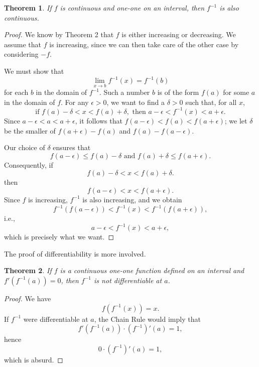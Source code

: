 \documentclass{article}
\numberwithin{corollary}{subsection}
\numberwithin{definition}{subsection}
\numberwithin{lemma}{subsection}
\newtheorem{theorem}{Theorem}
\numberwithin{theorem}{subsection}
\begin{document}
\begin{theorem}
  If $f$ is continuous and one-one on an interval, then $f^{-1}$ is also
  continuous.
\end{theorem}
\begin{proof}
  We know by Theorem 2 that $f$ is either increasing or decreasing. We assume
  that $f$ is increasing, since we can then take care of the other case by
  considering $-f$.

  We must show that \[
    \lim_{x \to b} f^{-1}(x) = f^{-1}(b)
  \] for each $b$ in the domain of $f^{-1}$. Such a number $b$ is of the form
  $f(a)$ for some $a$ in the domain of $f$. For any $\epsilon > 0$, we want to
  find a $\delta > 0$ such that, for all $x$, \[
    \text{if } f(a) - \delta < x < f(a) + \delta,
    \text{ then } a - \epsilon < f^{-1}(x) < a + \epsilon.
  \] Since $a - \epsilon < a < a + \epsilon$, it follows that $f(a - \epsilon)
  < f(a) < f(a + \epsilon)$; we let $\delta$ be the smaller of $f(a + \epsilon)
  - f(a)$ and $f(a) - f(a - \epsilon)$.

  Our choice of $\delta$ ensures that \[
    f(a - \epsilon)
    \leq f(a) - \delta \text{ and } f(a) + \delta \leq f(a + \epsilon).
  \] Consequently, if \[
    f(a) - \delta < x < f(a) + \delta.
  \] then \[
    f(a - \epsilon) < x < f(a + \epsilon).
    \] Since $f$ is increasing, $f^{-1}$ is also increasing, and we obtain \[
    f^{-1}(f(a - \epsilon)) < f^{-1}(x) < f^{-1}(f(a + \epsilon)),
  \] i.e., \[
    a - \epsilon < f^{-1}(x) < a + \epsilon,
  \] which is precisely what we want.
\end{proof}

The proof of differentiability is more involved.

\begin{theorem}
  If $f$ is a continuous one-one function defined on an interval and
  $f'(f^{-1}(a)) = 0$, then $f^{-1}$ is \emph{not} differentiable at $a$.
\end{theorem}
\begin{proof}
  We have \[
    f(f^{-1}(x)) = x.
  \] If $f^{-1}$ were differentiable at $a$, the Chain Rule would imply that \[
    f'(f^{-1}(a)) \cdot (f^{-1})'(a) = 1,
  \] hence \[
    0 \cdot (f^{-1})'(a) = 1,
  \] which is absurd.
\end{proof}
\end{document}
